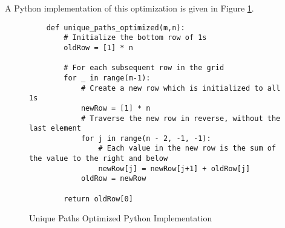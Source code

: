 A Python implementation of this optimization is given in Figure \ref{fig:unique-paths-optimized}.

\begin{figure}[H]
    \centering
    \begin{lstlisting}
    def unique_paths_optimized(m,n):
        # Initialize the bottom row of 1s
        oldRow = [1] * n
    
        # For each subsequent row in the grid
        for _ in range(m-1):
            # Create a new row which is initialized to all 1s
            newRow = [1] * n
            # Traverse the new row in reverse, without the last element
            for j in range(n - 2, -1, -1):
                # Each value in the new row is the sum of the value to the right and below
                newRow[j] = newRow[j+1] + oldRow[j]
            oldRow = newRow
    
        return oldRow[0]
    \end{lstlisting}
    \caption{Unique Paths Optimized Python Implementation}
    \label{fig:unique-paths-optimized}
\end{figure}